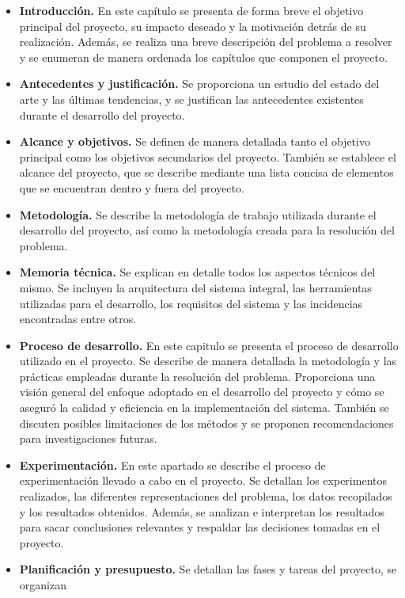 \begin{itemize}
    \item \textbf{Introducción.} En este capítulo se presenta de forma breve el objetivo 
    principal del proyecto, su impacto deseado y la motivación detrás de su realización. 
    Además, se realiza una  breve descripción del problema a resolver y se enumeran de manera 
    ordenada los capítulos que componen el proyecto.
    \item \textbf{Antecedentes y justificación.} Se proporciona un estudio del estado del 
    arte y las últimas tendencias, y se justifican las antecedentes existentes durante el 
    desarrollo del proyecto.
    \item \textbf{Alcance y objetivos.} Se definen de manera detallada tanto el objetivo 
    principal como los objetivos secundarios del proyecto. También se establece el alcance 
    del proyecto, que se describe mediante una lista concisa de elementos que se encuentran 
    dentro y fuera del proyecto.
    \item \textbf{Metodología.} Se describe la metodología de trabajo utilizada durante el
    desarrollo del proyecto, así como la metodología creada para la resolución del problema.
    \item \textbf{Memoria técnica.} Se explican en detalle todos los aspectos técnicos del mismo. 
    Se incluyen la arquitectura del sistema integral, las herramientas utilizadas para el desarrollo, 
    los requisitos del sistema y las incidencias encontradas entre otros.
    \item \textbf{Proceso de desarrollo.} En este capitulo se presenta el proceso de desarrollo 
    utilizado en el proyecto. Se describe de manera detallada la metodología y las prácticas 
    empleadas durante la resolución del problema. Proporciona una visión general del enfoque 
    adoptado en el desarrollo del proyecto y cómo se aseguró la calidad y eficiencia en la 
    implementación del sistema. También se discuten posibles limitaciones de los métodos 
    y se proponen recomendaciones para investigaciones futuras.
    \item \textbf{Experimentación.} En este apartado se describe el proceso de experimentación 
    llevado a cabo en el proyecto. Se detallan los experimentos realizados, las diferentes
    representaciones del problema, los datos recopilados y los resultados obtenidos. Además, 
    se analizan e interpretan los resultados para sacar conclusiones relevantes y respaldar 
    las decisiones tomadas en el proyecto.  
    \item \textbf{Planificación y presupuesto.} Se detallan las fases y tareas del proyecto, se organizan 

\end{itemize}
